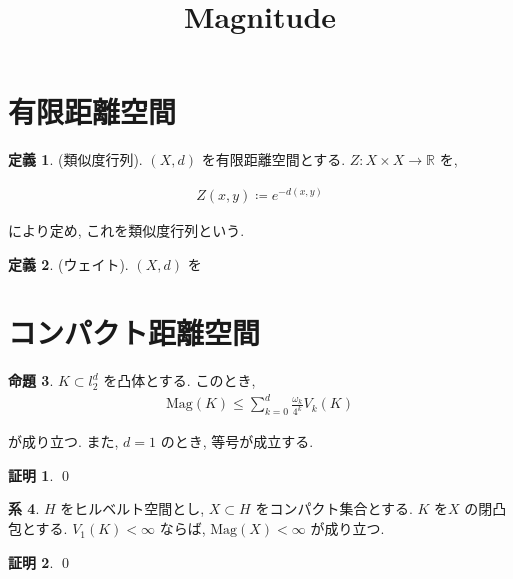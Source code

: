 \documentclass[10pt, fleqn, label-section=none]{bxjsarticle}
\title{Magnitude}
\date{}
\author{}
\theoremstyle{definition}
\newtheorem{dfn}{定義}[section]
\newtheorem{prop}[dfn]{命題}
\newtheorem{cor}[dfn]{系}
\newtheorem*{pf*}{証明}
\renewcommand{\;}{\, ; \,}
\newcommand{\Mag}{\textrm{Mag}}
\begin{document}
\maketitle



\section{有限距離空間}


\begin{dfn}(類似度行列). $(X, d)$ を有限距離空間とする. $Z:X \times X \rightarrow \mathbb R$ を, 

\begin{align*} Z(x, y) \coloneqq e^{-d(x, y)} \end{align*}

により定め, これを類似度行列という. 

\end{dfn}

\begin{dfn}(ウェイト). $(X, d)$ を

\end{dfn}




\section{コンパクト距離空間}


\begin{prop}$K \subset l_2^d$ を凸体とする. このとき, 
\begin{align*} \Mag(K) \leq \sum_{k = 0}^d \frac{\omega_k}{4^k} V_k (K) \end{align*}

が成り立つ. また, $d = 1$ のとき, 等号が成立する. 

\end{prop}
\begin{pf*}

\qed
\end{pf*}




\begin{cor}$H$ をヒルベルト空間とし, $X \subset  H$ をコンパクト集合とする. $K$ を$X$ の閉凸包とする. $V_1 (K) < \infty $ ならば, $\Mag (X) < \infty$ が成り立つ. 

\end{cor}
\begin{pf*}

\qed
\end{pf*}
\end{document}
